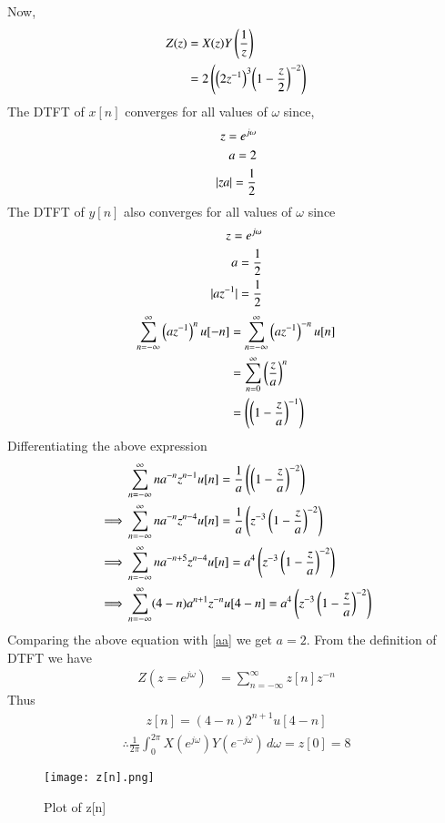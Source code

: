 \documentclass[journal,12pt,twocolumn]{IEEEtran}
\begin{document}
Now,
\begin{align}\label{aa}
  Z(z)&= X(z) Y\left(\frac{1}{z}\right) \\
  &=2\left( {\left(2z^{-1}\right)^3} {\left(1-\frac{z}{2}\right)^{-2}}\right)
\end{align}
The DTFT of $x[n]$ converges for all values of $\omega$ since,
\begin{align}
    z=e^{j\omega}\\
    a=2\\
    \vert{z}{a}\vert=\frac{1}{2}
\end{align}
The DTFT of $y[n]$ also converges for all values of $\omega$ since 
\begin{align}
    z=e^{j\omega}\\
    a=\frac{1}{2}\\
    \vert az^{-1}\vert=\frac{1}{2}
\end{align}
\begin{align}
\sum _{n=-\infty }^{\infty}\left(az^{-1}\right)^nu[-n]
&=\sum _{n=-\infty }^{\infty }\left(az^{-1}\right)^{-n}u[n]\\
&=\sum _{n=0 }^{\infty }\left(\frac{z}{a}\right)^n\\
&=\left(\left(1-\frac{z}{a}\right)^{-1}\right)
\end{align}
Differentiating the above expression 
\begin{align}
&\sum _{n=-\infty }^{\infty }na^{-n}z^{n-1}u[n]
=\frac{1}{a}\left(\left(1-\frac{z}{a}\right)^{-2}\right)\\
\implies & \sum _{n=-\infty }^{\infty }na^{-n}z^{n-4}u[n]
=\frac{1}{a}\left(z^{-3}\left(1-\frac{z}{a}\right)^{-2}\right)\\
\implies & \sum _{n=-\infty }^{\infty }na^{-n+5}z^{n-4}u[n]
=a^4\left(z^{-3}\left(1-\frac{z}{a}\right)^{-2}\right)\\
\implies & \sum _{n=-\infty }^{\infty }(4-n)a^{n+1}z^{-n}u[4-n]=a^4\left(z^{-3}\left(1-\frac{z}{a}\right)^{-2}\right)
\end{align}
Comparing the above equation with \eqref{aa} we get
$a=2$.
From the definition of DTFT we have
\begin{align}
 Z(z=e^{j\omega})&=  \sum _{n=-\infty }^{\infty }z[n]z^{-n}\label{2}
\end{align}
Thus
\begin{align}
 z[n]=(4-n)2^{n+1}u[4-n]
\end{align}
\begin{align}
    \therefore \frac{1}{2\pi} \int_{0}^{2\pi} X(e^{j\omega}) Y(e^{-j\omega}) \, d\omega =z[0]=8
\end{align}
\begin{figure}[!h]
         \centering
         \texttt{[image: z[n].png]}
         \caption{Plot of z[n]}
         \label{plot}
\end{figure}
\end{document}

